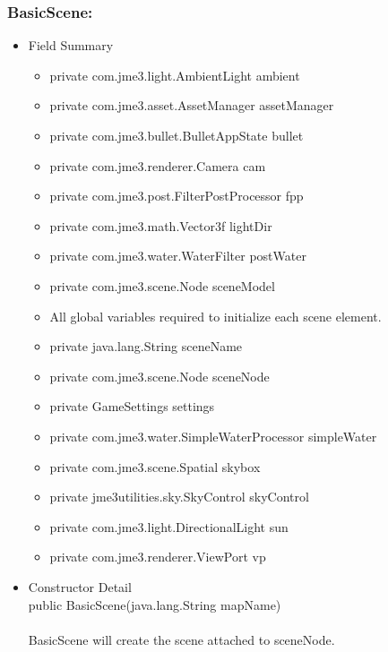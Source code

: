 \documentclass[letterpaper]{article}
\begin{document}
				\subsubsection*{BasicScene:}
				\vspace{0.1in}
					\begin{itemize}
						\item	Field Summary
								\begin{itemize}
									\item	private com.jme3.light.AmbientLight	ambient 
									\item	private com.jme3.asset.AssetManager	assetManager 
									\item	private com.jme3.bullet.BulletAppState	bullet 
									\item	private com.jme3.renderer.Camera	cam 
									\item	private com.jme3.post.FilterPostProcessor	fpp 
									\item	private com.jme3.math.Vector3f	lightDir 
									\item	private com.jme3.water.WaterFilter	postWater 
									\item	private com.jme3.scene.Node	sceneModel
									\item	All global variables required to initialize each scene element.
									\item	private java.lang.String	sceneName 
									\item	private com.jme3.scene.Node	sceneNode 
									\item	private GameSettings	settings 
									\item	private com.jme3.water.SimpleWaterProcessor	simpleWater 
									\item	private com.jme3.scene.Spatial	skybox 
									\item	private jme3utilities.sky.SkyControl	skyControl 
									\item	private com.jme3.light.DirectionalLight	sun 
									\item	private com.jme3.renderer.ViewPort	vp 
								\end{itemize}
						\item	Constructor Detail \\
								public BasicScene(java.lang.String mapName) \\ \\
								BasicScene will create the scene attached to sceneNode. \\ \\

\end{itemize}
\end{document}
